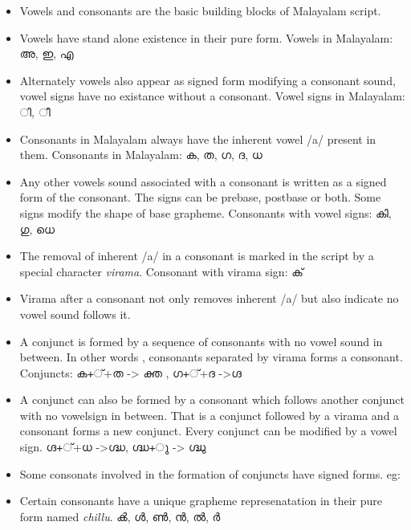 \documentclass[10pt]{article}
\begin{document}
\begin{itemize}
\item
Vowels and consonants are the basic building blocks of Malayalam script. 
\item
 Vowels have stand alone existence in their pure form. Vowels in Malayalam: {\manjari അ, ഇ, എ }
\item
Alternately vowels also appear as signed form modifying a consonant sound, vowel signs have no existance without a consonant. Vowel signs in Malayalam: {\manjari ി, ീ}
\item Consonants in Malayalam always have the inherent vowel /a/ present in them. Consonants in Malayalam: {\manjari ക, ത, ഗ, ദ, ധ }
\item
 Any other vowels sound associated with a consonant is written as a signed form of the consonant. The signs can be prebase, postbase or both. Some signs modify the shape of base grapheme. Consonants with vowel signs:  {\manjari കി, ഗു, ധെ } 

\item
The removal of inherent /a/ in a consonant is marked in the script by a special character \textit{virama}. Consonant with virama sign: {\manjari ക് }
\item
Virama after a consonant not only removes inherent /a/ but also indicate no vowel sound follows it. 
\item
A conjunct is formed by  a sequence of consonants with no vowel sound in between. In other words , consonants separated by virama forms a consonant. Conjuncts: {\manjari ക+്+ത -> ക്ത , ഗ+്+ദ ->ഗ്ദ }
\item
 A conjunct can also be formed by a consonant which follows another conjunct with no vowelsign in between. That is a conjunct followed by a virama and a consonant forms a new conjunct. Every conjunct can be modified by a vowel sign. {\manjari ഗ്ദ+്+ധ ->ഗ്ദ്ധ, ഗ്ദ്ധ+ു -> ഗ്ദ്ധു }

\item
Some consonats involved in the formation of conjuncts have signed forms. eg:{}
 
\item 
Certain consonants have a unique grapheme represenatation in their pure form named \textit{chillu}. {\manjari ൿ, ൾ, ൺ, ൻ, ൽ, ർ }
\end{itemize}


\paragraph{}
\end{document}
